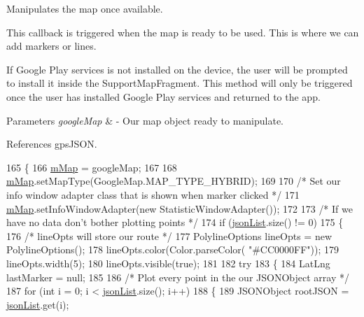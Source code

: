 Manipulates the map once available. 

This callback is triggered when the map is ready to be used. This is where we can add markers or lines.

If Google Play services is not installed on the device, the user will be prompted to install it inside the Support\+Map\+Fragment. This method will only be triggered once the user has installed Google Play services and returned to the app.


\begin{DoxyParams}{Parameters}
{\em google\+Map} & -\/ Our map object ready to manipulate. \\
\hline
\end{DoxyParams}


References gps\+J\+S\+ON.


\begin{DoxyCode}
165                                                 \{
166         \hyperlink{class_android_app_1_1_maps_activity_a373d4c770d2ab34538f9288d7c0e83ea}{mMap} = googleMap;
167 
168         \hyperlink{class_android_app_1_1_maps_activity_a373d4c770d2ab34538f9288d7c0e83ea}{mMap}.setMapType(GoogleMap.MAP\_TYPE\_HYBRID);
169 
170         \textcolor{comment}{/* Set our info window adapter class that is shown when marker clicked */}
171         \hyperlink{class_android_app_1_1_maps_activity_a373d4c770d2ab34538f9288d7c0e83ea}{mMap}.setInfoWindowAdapter(\textcolor{keyword}{new} StatisticWindowAdapter());
172 
173         \textcolor{comment}{/* If we have no data don't bother plotting points */}
174         \textcolor{keywordflow}{if} (\hyperlink{class_android_app_1_1_maps_activity_a5ff2abfd342648b27a17551d5bd668ac}{jsonList}.size() != 0)
175         \{
176             \textcolor{comment}{/* lineOpts will store our route */}
177             PolylineOptions lineOpts = \textcolor{keyword}{new} PolylineOptions();
178             lineOpts.color(Color.parseColor( \textcolor{stringliteral}{"#CC0000FF"}));
179             lineOpts.width(5);
180             lineOpts.visible(\textcolor{keyword}{true});
181 
182             \textcolor{keywordflow}{try}
183             \{
184                 LatLng lastMarker = null;
185 
186                 \textcolor{comment}{/* Plot every point in the our JSONObject array */}
187                 \textcolor{keywordflow}{for} (\textcolor{keywordtype}{int} i = 0; i < \hyperlink{class_android_app_1_1_maps_activity_a5ff2abfd342648b27a17551d5bd668ac}{jsonList}.size(); i++)
188                 \{
189                     JSONObject rootJSON = \hyperlink{class_android_app_1_1_maps_activity_a5ff2abfd342648b27a17551d5bd668ac}{jsonList}.get(i);

\end{DoxyCode}
